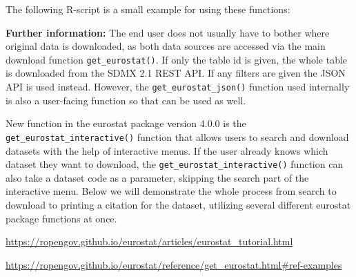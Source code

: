 The following R-script is a small example for using these functions: 

\textbf{Further information:} The end user does not usually have to bother where original data is downloaded, as both data sources are accessed via the main download function \verb|get_eurostat()|. If only the table id is given, the whole table is downloaded from the SDMX 2.1 REST API. If any filters are given the JSON API is used instead. However, the \verb|get_eurostat_json()| function used internally is also a user-facing function so that can be used as well.

New function in the eurostat package version 4.0.0 is the \verb|get_eurostat_interactive()| function that allows users to search and download datasets with the help of interactive menus. If the user already knows which dataset they want to download, the \verb|get_eurostat_interactive()| function can also take a dataset code as a parameter, skipping the search part of the interactive menu. Below we will demonstrate the whole process from search to download to printing a citation for the dataset, utilizing several different eurostat package functions at once.

\url{https://ropengov.github.io/eurostat/articles/eurostat_tutorial.html}

\url{https://ropengov.github.io/eurostat/reference/get_eurostat.html#ref-examples}